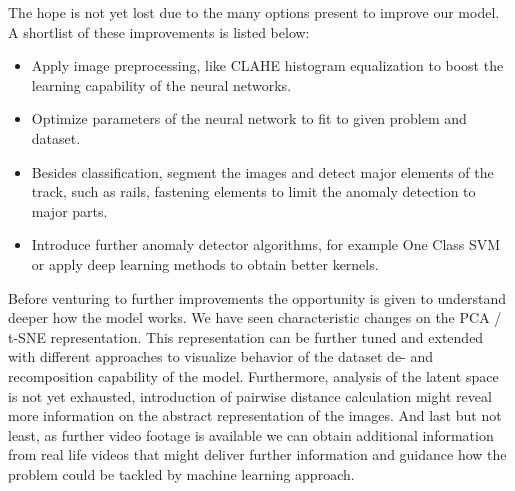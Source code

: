 The hope is not yet lost due to the many options present to improve our model.
A shortlist of these improvements is listed below:
\begin{itemize}
    \item Apply image preprocessing, like CLAHE histogram equalization to boost the learning
          capability of the neural networks.
    \item Optimize parameters of the neural network to fit to given problem and dataset.
    \item Besides classification, segment the images and detect major elements of the track,
          such as rails, fastening elements to limit the anomaly detection to major parts.
    \item Introduce further anomaly detector algorithms, for example One Class SVM or apply
          deep learning methods to obtain better kernels.
\end{itemize}

Before venturing to further improvements the opportunity is given to understand deeper how the
model works.
We have seen characteristic changes on the PCA / t-SNE representation.
This representation can be further tuned and extended with different approaches to visualize behavior
of the dataset de- and recomposition capability of the model.
Furthermore, analysis of the latent space is not yet exhausted, introduction of pairwise distance
calculation might reveal more information on the abstract representation of the images.
And last but not least, as further video footage is available we can obtain additional information
from real life videos that might deliver further information and guidance how the problem could
be tackled by machine learning approach.